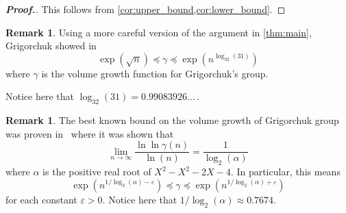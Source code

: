 \documentclass[11pt,a4paper,reqno]{amsart}
\theoremstyle{plain}
\theoremstyle{definition}
\theoremstyle{definition}
\newtheorem{remark}[theorem]{Remark}
\newenvironment{myproof}{\begin{proof}[\normalfont\bfseries Proof.]}{\end{proof}}
\begin{document}
\ThmMain

\begin{myproof}
  This follows from \cref{cor:upper_bound,cor:lower_bound}.
\end{myproof}

\begin{remark}
  Using a more careful version of the argument in \cref{thm:main}, Grigorchuk showed in \cite[Theorem B]{GrigrochukInter}
  \[
    \exp(\sqrt{n})
    \preccurlyeq
    \gamma
    \preccurlyeq
    \exp(n^{\log_{32}(31)})
  \]
  where $\gamma$ is the volume growth function for Grigorchuk's group.

  \medskip

  Notice here that $\log_{32}(31) = 0.99083926...$\,.
\end{remark}

\begin{remark}
  The best known bound on the volume growth of Grigorchuk group was proven in~\cite{Erschler2019} where it was shown that
  \[
    \lim_{n\to\infty} \frac{\ln\ln\gamma(n)}{\ln(n)}
    =
    \frac{1}{\log_2(\alpha)}
  \]
  where $\alpha$ is the positive real root of $X^2-X^2-2X-4$.
  In particular, this means
  \[
    \exp\left(n^{1/\log_2(\alpha) - \varepsilon}\right)
    \preccurlyeq
    \gamma
    \preccurlyeq
    \exp\left(n^{1/\log_2(\alpha) + \varepsilon}\right)
  \] for each constant $\varepsilon>0$.
  Notice here that $1/\log_2(\alpha) \approx 0.7674$.
\end{remark}


\printbibliography
\end{document}
